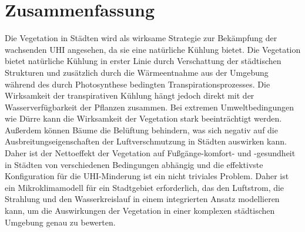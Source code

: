 \vskip 5cm

\vfill

\pagebreak

\chapter{Zusammenfassung}


Die Vegetation in Städten wird als wirksame Strategie zur Bekämpfung der wachsenden UHI angesehen, da sie eine natürliche Kühlung bietet. Die Vegetation bietet natürliche Kühlung in erster Linie durch Verschattung der städtischen Strukturen und zusätzlich durch die Wärmeentnahme aus der Umgebung während des durch Photosynthese bedingten Transpirationsprozesses. Die Wirksamkeit der transpirativen Kühlung hängt jedoch direkt mit der Wasserverfügbarkeit der Pflanzen zusammen. Bei extremen Umweltbedingungen wie Dürre kann die Wirksamkeit der Vegetation stark beeinträchtigt werden. Außerdem können Bäume die Belüftung behindern, was sich negativ auf die Ausbreitungseigenschaften der Luftverschmutzung in Städten auswirken kann. Daher ist der Nettoeffekt der Vegetation auf Fußgänge-komfort- und -gesundheit in Städten von verschiedenen Bedingungen abhängig und die effektivste Konfiguration für die UHI-Minderung ist ein nicht triviales Problem. Daher ist ein Mikroklimamodell für ein Stadtgebiet erforderlich, das den Luftstrom, die Strahlung und den Wasserkreislauf in einem integrierten Ansatz modellieren kann, um die Auswirkungen der Vegetation in einer komplexen städtischen Umgebung genau zu bewerten.

